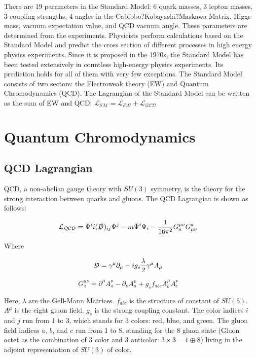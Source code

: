 There are 19 parameters in the Standard Model: 6 quark masses, 3 lepton masses, 3 coupling strengths, 4 angles in the Cabibbo?Kobayashi?Maskawa Matrix, Higgs mass, vacuum expectation value, and QCD vacuum angle. These parameters are determined from the experiments. Physicists perform calculations based on the Standard Model and predict the cross section of different processes in high energy physics experiments. Since it is proposed in the 1970s, the Standard Model has been tested extensively in countless high-energy physics experiments. Its prediction holds for all of them with very few exceptions. The Standard Model consists of two sectors: the Electroweak theory (EW) and Quantum Chromodynamics (QCD). The Lagrangian of the Standard Model can be written as the sum of EW and QCD: $\mathcal{L_{SM}} = \mathcal{L_{EW}} + \mathcal{L_{QCD}}$ 


\section{Quantum Chromodynamics}

\subsection{QCD Lagrangian}

QCD, a non-abelian gauge theory with $SU(3)$ symmetry, is the theory for the strong interaction between quarks and gluons. The QCD Lagrangian is shown as follows:


\begin{equation}
\mathcal{L_{QCD}} = \bar \Psi^i i (\slashed{D})_{ij} \Psi^j - m  \bar \Psi^i \Psi_i - \frac{1}{16\pi^2} G^{\mu\nu}_{a}G_{\mu\nu}^{a}
\end{equation}

Where 

\begin{equation}
\slashed{D} = \gamma^\mu \partial_\mu - i g_s \frac{\lambda}{2}  \gamma^\mu A_\mu
\end{equation}

\begin{equation}
G^{\mu\nu}_{a} = \partial^\mu A^\nu_{a} - \partial_{\nu} A^\mu_{a} + g_s f_{abc} A^\mu_b A^\nu_c 
\end{equation}

Here, $\lambda$ are the Gell-Mann Matrices. $f_{abc}$ is the structure of constant of $SU(3)$. $A^\mu$ is the eight gluon field. $g_s$ is the strong coupling constant. The color indices $i$ and $j$ run from 1 to 3, which stands for 3 colors: red, blue, and green. The gluon field indices $a$, $b$, and $c$ run from 1 to 8, standing for the 8 gluon state (Gluon octet as the combination of 3 color and 3 anticolor: $3 \times \bar 3 = 1 \oplus 8$) living in the adjoint representation of $SU(3)$ of color.  



